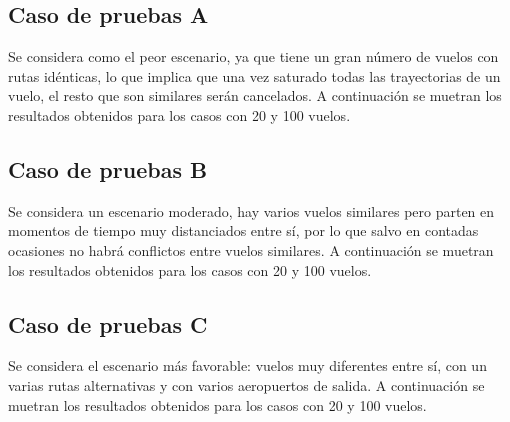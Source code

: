 \subsection*{Caso de pruebas A}
Se considera como el peor escenario, ya que tiene un gran número de vuelos con rutas idénticas, lo que implica que una vez saturado todas las trayectorias de un vuelo, el resto que son similares serán cancelados. A continuación se muetran los resultados obtenidos para los casos con 20 y 100 vuelos. 







\subsection*{Caso de pruebas B}
Se considera un escenario moderado, hay varios vuelos similares pero parten en momentos de tiempo muy distanciados entre sí, por lo que salvo en contadas ocasiones no habrá conflictos entre vuelos similares. A continuación se muetran los resultados obtenidos para los casos con 20 y 100 vuelos. 







\subsection*{Caso de pruebas C}
Se considera el escenario más favorable: vuelos muy diferentes entre sí, con un varias rutas alternativas y con varios aeropuertos de salida. A continuación se muetran los resultados obtenidos para los casos con 20 y 100 vuelos. 





